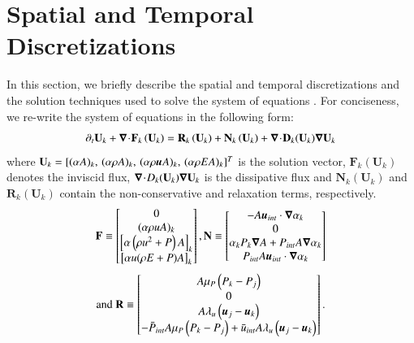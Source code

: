 \documentclass[preprint,10pt]{elsarticle}
\begin{document}
\section{Spatial and Temporal Discretizations} \label{sec:disc}
%
In this section, we briefly describe the spatial and temporal discretizations and the solution techniques 
used to solve the system of equations . For conciseness, we re-write the system of 
equations in the following form:
\begin{equation}
\label{eq:form}
\partial_t \mathbf{U}_k + \boldsymbol\nabla\! \cdot \! \mathbf{F}_k \left( \mathbf{U}_k \right) = \mathbf{R}_k \left( \mathbf{U}_k \right) + \mathbf{N}_k \left( \mathbf{U}_k \right) + \boldsymbol\nabla\! \cdot \! 
\mathbf{D}_k(\mathbf{U}_k) \boldsymbol\nabla \mathbf{U}_k
\end{equation}
where $\mathbf{U}_k=[(\alpha A )_k, \, (\alpha \rho A)_k,\, (\alpha \rho \boldsymbol u A)_k,\, (\alpha \rho E A)_k]^T$ is the solution vector, $\mathbf{F}_k 
\left( \mathbf{U}_k \right)$ denotes 
the inviscid flux, $\boldsymbol\nabla\! \cdot \! D_k (\mathbf{U}_k) \boldsymbol\nabla \mathbf{U}_k$ is the dissipative flux and $\mathbf{N}_k \left( \mathbf{U}_k \right)$ and $\mathbf{R}_k 
\left( \mathbf{U}_k \right)$ contain the non-conservative and relaxation terms, respectively. 
\begin{equation}
  \mathbf{F} \equiv
  \begin{bmatrix}
      0     \\
    ( \alpha \rho u A )_k     \\
    \left[ \alpha \left(\rho u^2 + P \right) A \right ]_k  \\
    \left[ \alpha u (\rho E + P) A \right]_k
  \end{bmatrix},
  \mathbf{N} \equiv
  \begin{bmatrix}
      - A \boldsymbol u_{int} \cdot \boldsymbol\nabla \alpha_k     \\
    0     \\
    \alpha_k P_k \boldsymbol\nabla A + P_{int} A \boldsymbol\nabla \alpha_k  \\
    P_{int} A \boldsymbol u_{int} \cdot \boldsymbol\nabla \alpha_k
  \end{bmatrix} \nonumber
\end{equation}
\begin{equation}
\text{and }
  \mathbf{R} \equiv
  \begin{bmatrix}
      A \mu_P \left( P_k - P_j \right)     \\
    0     \\
    A \lambda_u \left( \boldsymbol u_j - \boldsymbol u_k \right) \\
    - \bar{P}_{int} A \mu_P \left( P_k - P_j \right) + \bar{u}_{int} A \lambda_u \left( \boldsymbol u_j - \boldsymbol u_k \right)
  \end{bmatrix}. \nonumber
\end{equation}
%
\end{document}
